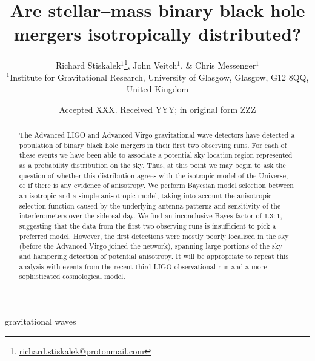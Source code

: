\documentclass[usenatbib,useAMS]{mnras}
\title[Are BBH mergers isotropically distributed?]
{Are stellar--mass binary black hole mergers isotropically distributed?}
\author[Stiskalek et al.]
{Richard Stiskalek$^{1}$\thanks{\href{mailto:richard.stiskalek@protonmail.com}{richard.stiskalek@protonmail.com}},
John Veitch$^{1}$, \& Chris Messenger$^{1}$
\\
%
$^{1}$Institute for Gravitational Research, University of Glasgow, Glasgow, G12 8QQ, United Kingdom}
\date{Accepted XXX. Received YYY; in original form ZZZ}
\begin{document}
\label{firstpage}
\pagerange{\pageref{firstpage}--\pageref{lastpage}}
\maketitle


\begin{abstract}
The Advanced LIGO and Advanced Virgo gravitational wave detectors have detected
a population of binary black hole mergers in their first two observing runs. For
each of these events we have been able to associate a potential sky location
region represented as a probability distribution on the sky. Thus, at this point
we may begin to ask the question of whether this distribution agrees with the
isotropic model of the Universe, or if there is any evidence of anisotropy. We
perform Bayesian model selection between an isotropic and a simple anisotropic
model, taking into account the anisotropic selection function caused by the
underlying antenna patterns and sensitivity of the interferometers over the
sidereal day. We find an inconclusive Bayes factor of $1.3:1$, suggesting that
the data from the first two observing runs is insufficient to pick a preferred
model. However, the first detections were mostly poorly localised
in the sky (before the Advanced Virgo joined the network), spanning large portions
of the sky and hampering detection of potential anisotropy. It will be
appropriate to repeat this analysis with events from the recent third LIGO
observational run and a more sophisticated cosmological model.
\end{abstract}

\begin{keywords}
gravitational waves
\end{keywords}


\end{document}
